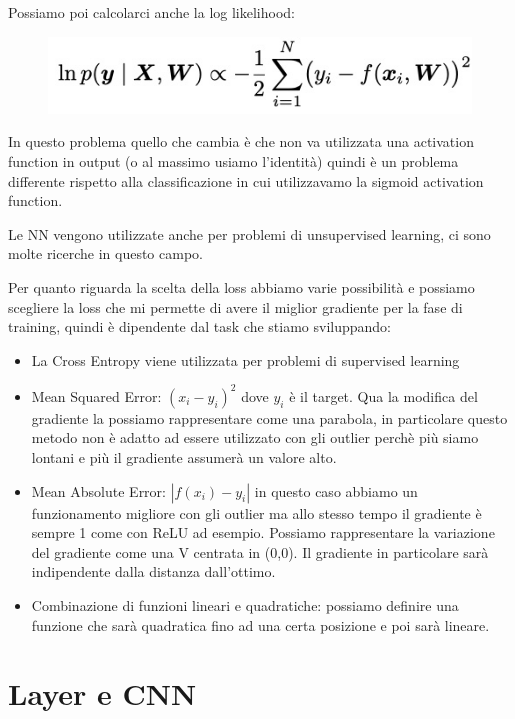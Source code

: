 \documentclass[14pt]{extreport}
\begin{document}
Possiamo poi calcolarci anche la log likelihood:

\begin{figure}[H]
\centering
\includegraphics[width=0.7\linewidth]{402.jpeg}
\end{figure}

In questo problema quello che cambia è che non va utilizzata una activation function in output (o al massimo usiamo l'identità) quindi è un problema
differente rispetto alla classificazione in cui utilizzavamo la sigmoid activation function.

Le NN vengono utilizzate anche per problemi di unsupervised learning, ci sono molte ricerche in questo campo.

Per quanto riguarda la scelta della loss abbiamo varie possibilità e possiamo scegliere la loss che mi permette di avere il miglior gradiente per la
fase di training, quindi è dipendente dal task che stiamo sviluppando:

\begin{itemize}
\item La Cross Entropy viene utilizzata per problemi di supervised learning
\item Mean Squared Error: $(x_i-y_i)^2$ dove $y_i$ è il target. Qua la modifica del gradiente la possiamo rappresentare come una parabola, in
particolare questo metodo non è adatto ad essere utilizzato con gli outlier perchè più siamo lontani e più il gradiente assumerà un valore alto.
\item Mean Absolute Error: $|f(x_i)-y_i|$ in questo caso abbiamo un funzionamento migliore con gli outlier ma allo stesso tempo il gradiente è sempre
1 come con ReLU ad esempio. Possiamo rappresentare la variazione del gradiente come una V centrata in (0,0). Il gradiente in particolare sarà
indipendente dalla distanza dall'ottimo.
\item Combinazione di funzioni lineari e quadratiche: possiamo definire una funzione che sarà quadratica fino ad una certa posizione e poi sarà
lineare.
\end{itemize}


\section{Layer e CNN}
\end{document}
